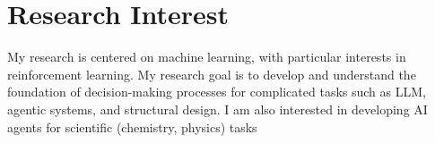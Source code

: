 
\section{Research Interest}

My research is centered on machine learning, with particular interests in reinforcement learning. My research goal is to develop and understand the foundation of decision-making processes for complicated tasks such as LLM, agentic systems, and structural design. I am also interested in developing AI agents for scientific (chemistry, physics) tasks
